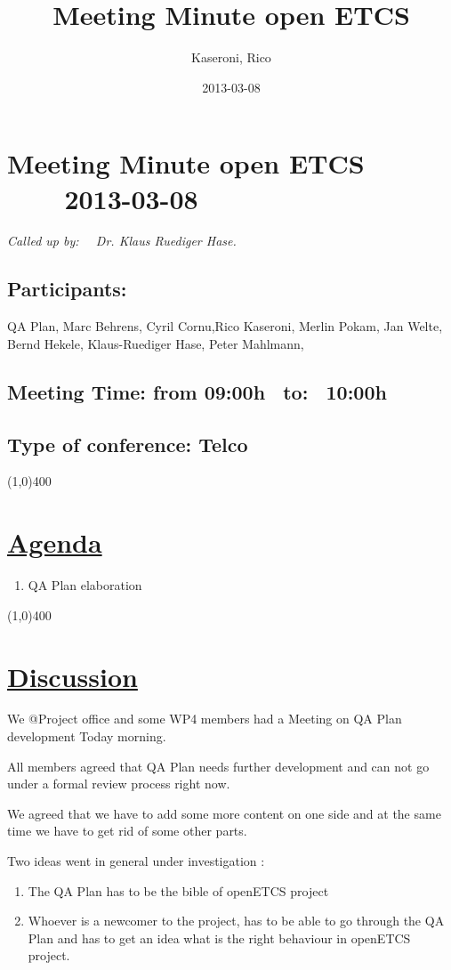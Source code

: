 \documentclass[a4paper]{article}
\title{Meeting Minute open ETCS}
\author{Kaseroni, Rico}
\date{2013-03-08}
\begin{document}
\section*{\large{Meeting Minute open ETCS \ \ \ \ 2013-03-08}}

\large{\emph{Called up by: \ \  Dr. Klaus Ruediger Hase.}}

\subsection*{Participants:} QA Plan, Marc Behrens, Cyril Cornu,Rico Kaseroni,  Merlin Pokam,  Jan Welte, Bernd Hekele, Klaus-Ruediger Hase, Peter Mahlmann, \\

\subsection*{Meeting Time: from 09:00h \ to: \ 10:00h}

\subsection*{Type of conference: Telco}

\line(1,0){400}
\section*{\underline{Agenda}}
\begin{enumerate}
\item QA Plan elaboration 

\end{enumerate}
\line(1,0){400}
\section*{\underline{Discussion}}
We @Project office and some WP4 members had a Meeting on QA Plan
 development Today morning.
 
All members agreed that QA Plan needs further development and can not go
 under a formal review process right now.
 
We agreed that we have to add some more content on one side and at the same
 time we have to get rid of some other parts.
 
Two ideas went in general  under investigation :
\begin{enumerate}
 \item The QA Plan has to be the bible of openETCS project
\item Whoever is a newcomer to the project, has to be able to go through the
 QA Plan and has to get an idea what is the right behaviour in openETCS
 project.
\end{enumerate}
 
\end{document}
